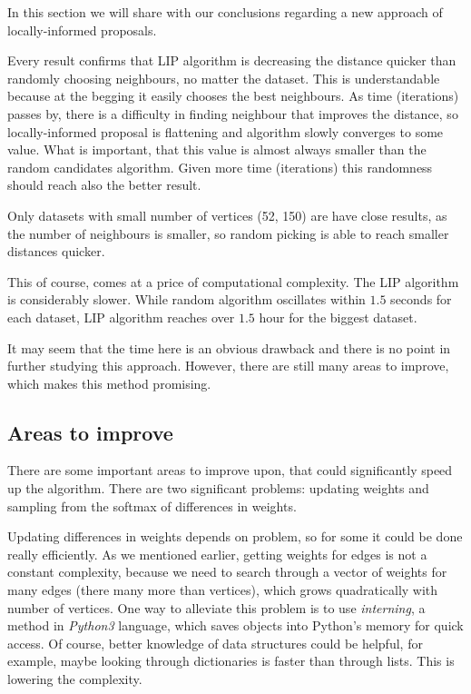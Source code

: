 In this section we will share with our conclusions regarding a new approach of locally-informed proposals.

Every result confirms that LIP algorithm is decreasing the distance quicker than randomly choosing neighbours, no matter the dataset. This is understandable because at the begging it easily chooses the best neighbours. As time (iterations) passes by, there is a difficulty in finding neighbour that improves the distance, so locally-informed proposal is flattening and algorithm slowly converges to some value. What is important, that this value is almost always smaller than the random candidates algorithm. Given more time (iterations) this randomness should reach also the better result.

Only datasets with small number of vertices (52, 150) are have close results, as the number of neighbours is smaller, so random picking is able to reach smaller distances quicker.

This of course, comes at a price of computational complexity. The LIP algorithm is considerably slower. While random algorithm oscillates within $1.5$ seconds for each dataset, LIP algorithm reaches over $1.5$ hour for the biggest dataset.

It may seem that the time here is an obvious drawback and there is no point in further studying this approach. However, there are still many areas to improve, which makes this method promising.

\subsection{Areas to improve}
	There are some important areas to improve upon, that could significantly speed up the algorithm. There are two significant problems: updating weights and sampling from the softmax of differences in weights. 
	
	Updating differences in weights depends on problem, so for some it could be done really efficiently. As we mentioned earlier, getting weights for edges is not a constant complexity, because we need to search through a vector of weights for many edges (there many more than vertices), which grows quadratically with number of vertices. One way to alleviate this problem is to use \textit{interning}, a method in \textit{Python3} language, which saves objects into Python's memory for quick access. Of course, better knowledge of data structures could be helpful, for example, maybe looking through dictionaries is faster than through lists. This is lowering the complexity.
	

